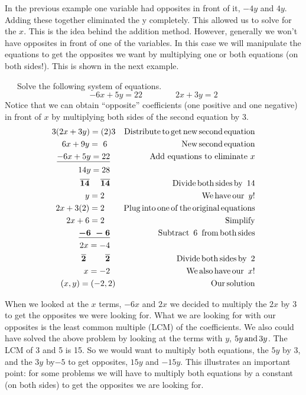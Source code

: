In the previous example one variable had opposites in front of it, $- 4 y$ and
$4 y$. Adding these together eliminated the y completely. This allowed us to
solve for the $x$. This is the idea behind the addition method. However,
generally we won't have opposites in front of one of the variables. In this
case we will manipulate the equations to get the opposites we want by
multiplying one or both equations (on both sides!). This is shown in the next
example.

\begin{example}~~~Solve the following system of equations.
      $$- 6 x + 5 y = 22\qquad\qquad 2 x + 3 y = 2$$
			Notice that we can obtain ``opposite'' coefficients (one positive and one negative) in front of $x$ by multiplying both sides of the second equation by 3.
\begin{eqnarray*}
    3 (2 x + 3 y) = (2) 3 &  & \operatorname{Distribute} \operatorname{to} \operatorname{get}
    \operatorname{new} \operatorname{second} \operatorname{equation}\\
    6 x + 9 y = ~6~~~&  & \operatorname{New} \operatorname{second} \operatorname{equation}\\
    \underline{- 6 x + 5 y = 22}~~ &  & \text{Add~equations~to eliminate~} x\\
    14 y = 28~~ &  &\\
    \boldsymbol{\overline{14} ~~~~ \overline{14}}~~ &  & \operatorname{Divide} \operatorname{both} \operatorname{sides} \operatorname{by~} 14 \\
    y = 2~~~~ &  & \operatorname{We} \operatorname{have} \operatorname{our~} y!\\
    2 x + 3 (2) = 2~~~~ &  & \operatorname{Plug} \operatorname{into} \operatorname{one} \operatorname{of}
    \operatorname{the} \operatorname{original} \operatorname{equations}\\
    2 x + 6 = 2~~~~ &  & \operatorname{Simplify}\\
    \boldsymbol{\underline{- 6 ~- 6}}~~ &  & \operatorname{Subtract~} 6 \operatorname{~from} \operatorname{both} \operatorname{sides}\\
    2 x = - 4~~ &  & \\
    \boldsymbol{\overline{2} ~~~~~~~ \overline{2}}~~ &  & \operatorname{Divide} \operatorname{both} \operatorname{sides} \operatorname{by~} 2\\
    x = - 2~~ &  & \operatorname{We} \operatorname{also} \operatorname{have} \operatorname{our~} x!\\
    (x,y)=(- 2, 2) &  & \operatorname{Our} \operatorname{solution}
  \end{eqnarray*}
\end{example}
  


When we looked at the $x$ terms, $- 6 x$ and $2 x$ we decided to multiply the
$2 x$ by 3 to get the opposites we were looking for. What we are looking for
with our opposites is the least common multiple (LCM) of the coefficients. We
also could have solved the above problem by looking at the terms with $y$, $5
y \operatorname{and} 3 y$. The LCM of 3 and 5 is 15. So we would want to multiply both
equations, the $5 y$ by 3, and the $3 y$ by$- 5$ to get opposites, $15 y$ and
$- 15 y$. This illustrates an important point: for some problems we will have to
multiply both equations by a constant (on both sides) to get the opposites we
are looking for.

